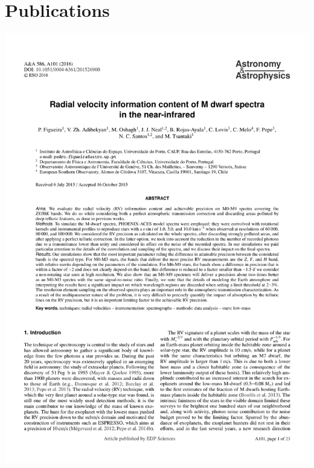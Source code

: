 \section{Publications}\label{appsec:publications}
{\centering
    {\includegraphics[width=.9\textwidth, keepaspectratio=true, page = 1, trim = 1cm 1cm 1cm 1cm, clip = true]{appendices/papers/Figueira2016_grey.pdf}}

}
